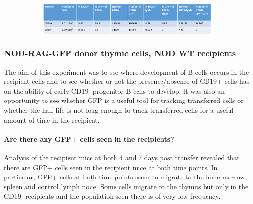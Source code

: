 
\begin{figure}
	\begin{subfigure}{\textwidth}
	\includegraphics[width=\textwidth]{Figures/GFPdonortable.png}
	\end{subfigure}
\end{figure}




\subsubsection{NOD-RAG-GFP donor thymic cells, NOD WT recipients}

The aim of this experiment was to see where development of B cells occurs in the recipient cells and to see whether or not the presence/absence of CD19+ cells has on the ability of early CD19- progenitor B cells to develop.
It was also an opportunity to see whether GFP is a useful tool for tracking transferred cells or whether the half life is not long enough to track transferred cells for a useful amount of time in the recipient.

\paragraph{Are there any GFP+ cells seen in the recipients?}

Analysis of the recipient mice at both 4 and 7 days post transfer revealed that there are GFP+ cells seen in the recipient mice at both time points.
In particular, GFP+ cells at both time points seem to migrate to the bone marrow, spleen and control lymph node. 
Some cells migrate to the thymus but only in the CD19- recipients and the population seen there is of very low frequency.

